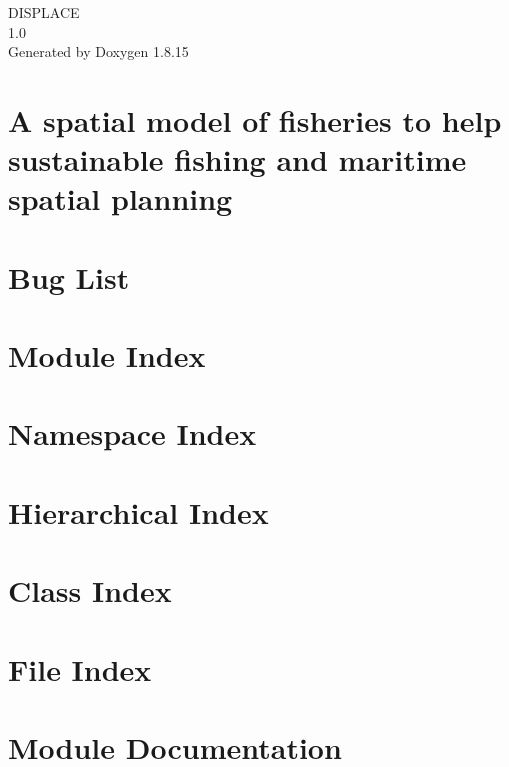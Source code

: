 \let\mypdfximage\pdfximage\def\pdfximage{\immediate\mypdfximage}\documentclass[twoside]{book}
\newcommand{\+}{\discretionary{\mbox{\scriptsize$\hookleftarrow$}}{}{}}
\newcommand{\clearemptydoublepage}{%
  \newpage{\pagestyle{empty}\cleardoublepage}%
}
\begin{document}
\hypersetup{pageanchor=false,
             bookmarksnumbered=true,
             pdfencoding=unicode
            }
\begin{titlepage}
\vspace*{7cm}
\begin{center}%
{\Large D\+I\+S\+P\+L\+A\+CE \\[1ex]\large 1.\+0 }\\
\vspace*{1cm}
{\large Generated by Doxygen 1.8.15}\\
\end{center}
\end{titlepage}
\clearemptydoublepage
{}
\tableofcontents
\clearemptydoublepage
{}
\hypersetup{pageanchor=true}

\chapter{A spatial model of fisheries to help sustainable fishing and maritime spatial planning}
\label{index}\hypertarget{index}{}
\chapter{Bug List}
\label{bug}

\chapter{Module Index}

\chapter{Namespace Index}

\chapter{Hierarchical Index}

\chapter{Class Index}

\chapter{File Index}

\chapter{Module Documentation}

\end{document}
